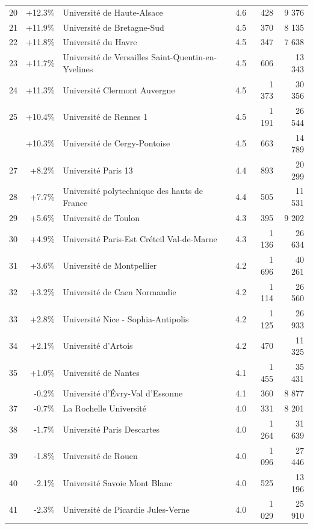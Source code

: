 \documentclass[12pt,french,]{article}
\begin{document}
\begin{longtable}{rrlrrr}
20 & +12.3\% & Université de Haute-Alsace & 4.6 & 428 & 9 376\\
\addlinespace
\rowcolor{gray!6}  21 & +11.9\% & Université de Bretagne-Sud & 4.5 & 370 & 8 135\\
22 & +11.8\% & Université du Havre & 4.5 & 347 & 7 638\\
\rowcolor{gray!6}  23 & +11.7\% & Université de Versailles Saint-Quentin-en-Yvelines & 4.5 & 606 & 13 343\\
24 & +11.3\% & Université Clermont Auvergne & 4.5 & 1 373 & 30 356\\
\rowcolor{gray!6}  25 & +10.4\% & Université de Rennes 1 & 4.5 & 1 191 & 26 544\\
\addlinespace
26 & +10.3\% & Université de Cergy-Pontoise & 4.5 & 663 & 14 789\\
\rowcolor{gray!6}  27 & +8.2\% & Université Paris 13 & 4.4 & 893 & 20 299\\
28 & +7.7\% & Université polytechnique des hauts de France & 4.4 & 505 & 11 531\\
\rowcolor{gray!6}  29 & +5.6\% & Université de Toulon & 4.3 & 395 & 9 202\\
30 & +4.9\% & Université Paris-Est Créteil Val-de-Marne & 4.3 & 1 136 & 26 634\\
\addlinespace
\rowcolor{gray!6}  31 & +3.6\% & Université de Montpellier & 4.2 & 1 696 & 40 261\\
32 & +3.2\% & Université de Caen Normandie & 4.2 & 1 114 & 26 560\\
\rowcolor{gray!6}  33 & +2.8\% & Université Nice - Sophia-Antipolis & 4.2 & 1 125 & 26 933\\
34 & +2.1\% & Université d'Artois & 4.2 & 470 & 11 325\\
\rowcolor{gray!6}  35 & +1.0\% & Université de Nantes & 4.1 & 1 455 & 35 431\\
\addlinespace
36 & -0.2\% & Université d'Évry-Val d'Essonne & 4.1 & 360 & 8 877\\
\rowcolor{gray!6}  37 & -0.7\% & La Rochelle Université & 4.0 & 331 & 8 201\\
38 & -1.7\% & Université Paris Descartes & 4.0 & 1 264 & 31 639\\
\rowcolor{gray!6}  39 & -1.8\% & Université de Rouen & 4.0 & 1 096 & 27 446\\
40 & -2.1\% & Université Savoie Mont Blanc & 4.0 & 525 & 13 196\\
\addlinespace
\rowcolor{gray!6}  41 & -2.3\% & Université de Picardie Jules-Verne & 4.0 & 1 029 & 25 910\\

\end{longtable}
\end{document}
